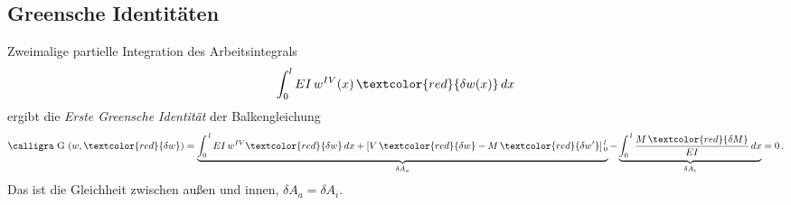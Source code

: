 {\textcolor{hellgrau2}{\section{Greensche Identit\"{a}ten}}}\label{Greensche Identitaeten}
Zweimalige partielle Integration des Arbeitsintegrals
\begin{align} \label{Eq12}
\int_{0}^{l} EI\,w^{IV}(x)\,\textcolor{red}{\delta w(x)}\,dx
\end{align}
ergibt die {\em Erste Greensche Identit\"{a}t\/} der Balkengleichung
\begin{align} \label{Eq16}
\text{\normalfont\calligra G\,\,}(w, \textcolor{red}{\delta w}) = \underbrace{\int_0^{\,l} EI\,w^{IV}\textcolor{red}{\delta w}\,dx + [V\,\textcolor{red}{\delta w} -
M\,\textcolor{red}{\delta w'}]_{\,0}^{\,l}}_{\delta A_a}
 - \underbrace{\int_0^{\,l} \frac{M\,\textcolor{red}{\delta M}}{EI}\,dx}_{\delta A_i} = 0\,.
\end{align}
Das ist die Gleichheit zwischen au{\ss}en und innen, $\delta A_a = \delta A_i$.

